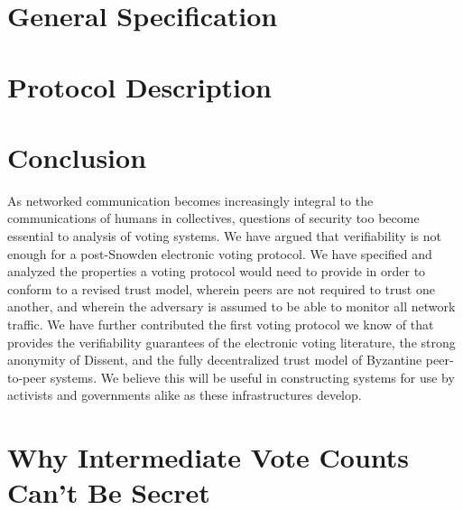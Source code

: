 \documentclass[finalcopy,nolof,nolot]{srpaper}
\begin{document}
\chapter{General Specification}\label{Chapter:Spec}


\chapter{Protocol Description}\label{Chapter:Protocol}


% 

\chapter{Conclusion}\label{Chapter:Conclusion}
As networked communication becomes increasingly integral to the communications
of humans in collectives, questions of security too become essential to analysis
of voting systems. We have argued that verifiability is not enough for a
post-Snowden electronic voting protocol. We have specified and analyzed the
properties a voting protocol would need to provide in order to conform to a
revised trust model, wherein peers are not required to trust one another, and
wherein the adversary is assumed to be able to monitor all network traffic. We
have further contributed the first voting protocol we know of that provides the
verifiability guarantees of the electronic voting literature, the strong
anonymity of Dissent, and the fully decentralized trust model of Byzantine
peer-to-peer systems. We believe this will be useful in constructing systems for
use by activists and governments alike as these infrastructures develop.

\listoftodos


\appendix
\chapter{Why Intermediate Vote Counts Can't Be
Secret}\label{Appendix:SecretProof}

\end{document}
